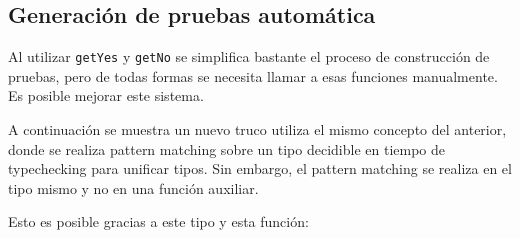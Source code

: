 
\subsection{Generación de pruebas automática}

Al utilizar \texttt{getYes} y \texttt{getNo} se simplifica bastante el proceso de construcción de pruebas, pero de todas formas se necesita llamar a esas funciones manualmente. Es posible mejorar este sistema.

A continuación se muestra un nuevo truco utiliza el mismo concepto del anterior, donde se realiza pattern matching sobre un tipo decidible en tiempo de typechecking para unificar tipos. Sin embargo, el pattern matching se realiza en el tipo mismo y no en una función auxiliar.

Esto es posible gracias a este tipo y esta función:

